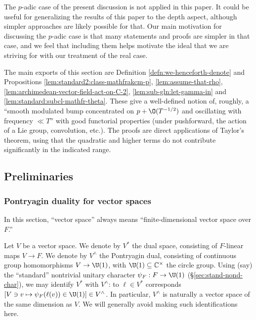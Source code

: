 The $p$-adic case of the present discussion is not applied in this paper.  It could be useful for generalizing the results of this paper to the depth aspect, although simpler approaches are likely possible for that.  Our main motivation for discussing the $p$-adic case is that many statements and proofs are simpler in that case, and we feel that including them helps motivate the ideal that we are striving for with our treatment of the real case.

The main exports of this section are Definition \ref{defn:we-henceforth-denote} and Propositions \ref{lem:standard2:class-mathfrakcm-p}, \ref{lem:assume-that-rho}, \ref{lem:archimedean-vector-field-act-on-C-2}, \ref{lem:sub-gln:let-gamma-in} and \ref{lem:standard:subcl-mathfr-theta}.  These give a well-defined notion of, roughly, a ``smooth modulated bump concentrated on $p + \O(T^{-1/2})$ and oscillating with frequency $\ll T$'' with good functorial properties (under pushforward, the action of a Lie group, convolution, etc.).  The proofs are direct applications of Taylor's theorem, using that the quadratic and higher terms do not contribute significantly in the indicated range.





\subsection{Preliminaries}

\subsubsection{Pontryagin duality for vector spaces}\label{sec:pontry-dual-vect}
In this section, ``vector space'' always means ``finite-dimensional vector space over $F$.''

Let $V$ be a vector space.  We denote by $V^*$ the dual space, consisting of $F$-linear maps $V \rightarrow F$.  We denote by $V^\wedge$ the Pontryagin dual, consisting of continuous group homomorphisms $V \rightarrow \U(1)$, with $\U(1) \subseteq \mathbb{C}^\times$ the circle group.  Using (say) the ``standard'' nontrivial unitary character $\psi_F : F \rightarrow \U(1)$ (\S\ref{sec:stand-nond-char}), we may identify $V^*$ with $V^\wedge$: to $\ell \in V^*$ corresponds $[V \ni v \mapsto \psi_F(\ell(v)) \in \U(1)] \in V^\wedge$.  In particular, $V^\wedge$ is naturally a vector space of the same dimension as $V$.  We will generally avoid making such identifications here.


